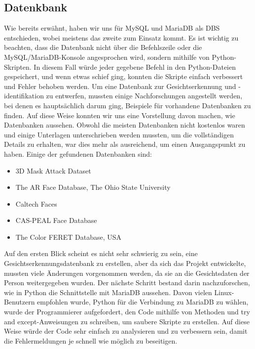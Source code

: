 \subsection{Datenkbank}
Wie bereits erwähnt, haben wir uns für MySQL und MariaDB als DBS entschieden, wobei meistens das zweite zum Einsatz kommt. Es ist wichtig zu beachten, dass die Datenbank nicht über die Befehlszeile oder die MySQL/MariaDB-Konsole angesprochen wird, sondern mithilfe von Python-Skripten. In diesem Fall würde jeder gegebene Befehl in den Python-Dateien gespeichert, und wenn etwas schief ging, konnten die Skripte einfach verbessert und Fehler behoben werden.
\bigbreak
Um eine Datenbank zur Gesichtserkennung und -identifikation zu entwerfen, mussten einige Nachforschungen angestellt werden, bei denen es hauptsächlich darum ging, Beispiele für vorhandene Datenbanken zu finden. Auf diese Weise konnten wir uns eine Vorstellung davon machen, wie Datenbanken aussehen. Obwohl die meisten Datenbanken nicht kostenlos waren und einige Unterlagen unterschrieben werden mussten, um die vollständigen Details zu erhalten, war dies mehr als ausreichend, um einen Ausgangspunkt zu haben. Einige der gefundenen Datenbanken sind:
\begin{itemize}
	\item 3D Mask Attack Dataset\cite{Database1}
	\item The AR Face Database, The Ohio State University\cite{Database2}
	\item Caltech Faces\cite{Database3}
	\item CAS-PEAL Face Database\cite{Database4}
	\item The Color FERET Database, USA\cite{Database5}
\end{itemize}
Auf den ersten Blick scheint es nicht sehr schwierig zu sein, eine Gesichtserkennungsdatenbank zu erstellen, aber da sich das Projekt entwickelte, mussten viele Änderungen vorgenommen werden, da sie an die Gesichtsdaten der Person weitergegeben wurden.
\bigbreak
Der nächste Schritt bestand darin nachzuforschen, wie in Python die Schnittstelle mit MariaDB aussehen. Davon vielen Linux-Benutzern empfohlen wurde, Python für die Verbindung zu MariaDB zu wählen, wurde der Programmierer aufgefordert, den Code mithilfe von Methoden und try and except-Anweisungen zu schreiben, um saubere Skripte zu erstellen. Auf diese Weise würde der Code sehr einfach zu analysieren und zu verbessern sein, damit die Fehlermeldungen je schnell wie möglich zu beseitigen.
